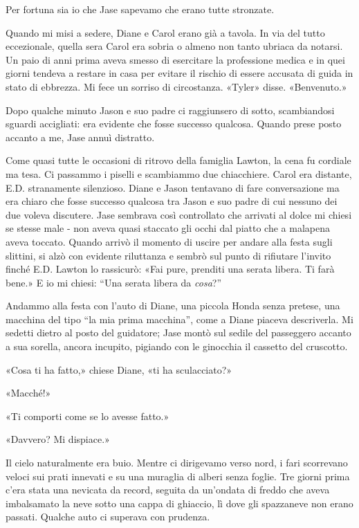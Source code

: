 Per fortuna sia io che Jase sapevamo che erano tutte stronzate.

Quando mi misi a sedere, Diane e Carol erano già a tavola. In via del
tutto eccezionale, quella sera Carol era sobria o almeno non tanto
ubriaca da notarsi. Un paio di anni prima aveva smesso di esercitare la
professione medica e in quei giorni tendeva a restare in casa per
evitare il rischio di essere accusata di guida in stato di ebbrezza. Mi
fece un sorriso di circostanza. «Tyler» disse. «Benvenuto.»

Dopo qualche minuto Jason e suo padre ci raggiunsero di sotto,
scambiandosi sguardi accigliati: era evidente che fosse successo
qualcosa. Quando prese posto accanto a me, Jase annuì distratto.

Come quasi tutte le occasioni di ritrovo della famiglia Lawton, la cena
fu cordiale ma tesa. Ci passammo i piselli e scambiammo due chiacchiere.
Carol era distante, E.D. stranamente silenzioso. Diane e Jason tentavano
di fare conversazione ma era chiaro che fosse successo qualcosa tra
Jason e suo padre di cui nessuno dei due voleva discutere. Jase sembrava
così controllato che arrivati al dolce mi chiesi se stesse male - non
aveva quasi staccato gli occhi dal piatto che a malapena aveva toccato.
Quando arrivò il momento di uscire per andare alla festa sugli slittini,
si alzò con evidente riluttanza e sembrò sul punto di rifiutare l'invito
finché E.D. Lawton lo rassicurò: «Fai pure, prenditi una serata libera.
Ti farà bene.» E io mi chiesi: ``Una serata libera da \emph{cosa}?''

Andammo alla festa con l'auto di Diane, una piccola Honda senza pretese,
una macchina del tipo ``la mia prima macchina'', come a Diane piaceva
descriverla. Mi sedetti dietro al posto del guidatore; Jase montò sul
sedile del passeggero accanto a sua sorella, ancora incupito, pigiando
con le ginocchia il cassetto del cruscotto.

«Cosa ti ha fatto,» chiese Diane, «ti ha sculacciato?»

«Macché!»

«Ti comporti come se lo avesse fatto.»

«Davvero? Mi dispiace.»

Il cielo naturalmente era buio. Mentre ci dirigevamo verso nord, i fari
scorrevano veloci sui prati innevati e su una muraglia di alberi senza
foglie. Tre giorni prima c'era stata una nevicata da record, seguita da
un'ondata di freddo che aveva imbalsamato la neve sotto una cappa di
ghiaccio, lì dove gli spazzaneve non erano passati. Qualche auto ci
superava con prudenza.

